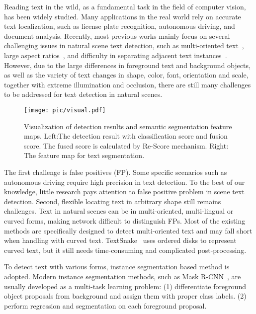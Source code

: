 \documentclass[letterpaper]{article} \usepackage{aaai19}  \usepackage{times}  \usepackage{helvet}  \usepackage{courier}  \usepackage{url}  \usepackage{graphicx}
\begin{document}
Reading text in the wild, as a fundamental task in the field of computer vision, has been widely studied. 
Many applications in the real world rely on accurate text localization, such as license plate recognition, autonomous driving, and document analysis.
Recently, most previous works mainly focus on several challenging issues in natural scene text detection, such as multi-oriented text~\cite{lyu2018multi}, large aspect ratios~\cite{liao2018rotation}, and difficulty in separating adjacent text instances~\cite{deng2018pixellink}. 
However, due to the large differences in foreground text and background objects, as well as the variety of text changes in shape, color, font, orientation and scale, together with extreme illumination and occlusion, there are still many challenges to be addressed for text detection in natural scenes.


\begin{figure}[ht!]
\centering
\texttt{[image: pic/visual.pdf]}
\caption{\label{visual}{
Visualization of detection results and semantic segmentation feature maps.
Left:The detection result with classification score and fusion score.
The fused score is calculated by Re-Score mechanism. 
Right: The feature map for text segmentation.
}}
\end{figure}

The first challenge is false positives (FP). Some specific scenarios such as autonomous driving require high precision in text detection. 
To the best of our knowledge, little research pays attention to false positive problem in scene text detection. 
Second, flexible locating text in arbitrary shape still remains challenges. 
Text in natural scenes can be in multi-oriented, multi-lingual or curved forms, making network difficult to distinguish FPs.   
Most of the existing methods are specifically designed to detect multi-oriented text and may fall short when handling with curved text. 
TextSnake~\cite{long2018textsnake} uses ordered disks to represent curved text, but it still needs time-consuming and complicated post-processing.


\iffalse
Instance segmentation based methods like Mask R-CNN~\cite{he2017mask} achieved remarkable results in general object detection and segmentation, and it can be easily migrated to shape robust text detection tasks.
\fi

To detect text with various forms, instance segmentation based method is adopted. 
Modern instance segmentation methods, such as Mask R-CNN~\cite{he2017mask}, are usually developed as a multi-task learning problem:
(1) differentiate foreground object proposals from background and assign them with proper class labels. 
(2) perform regression and segmentation on each foreground proposal. 
\end{document}
